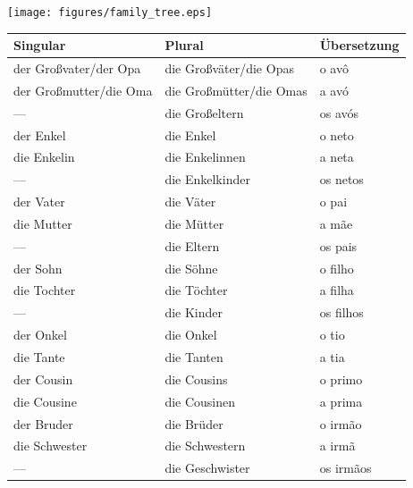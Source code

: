         \texttt{[image: figures/family\_tree.eps]}

        \renewcommand{\baselinestretch}{1}
        \renewcommand{\arraystretch}{1.5}
        \begin{longtabu}to 
            \toprule
            \textbf{Singular} & \textbf{Plural} & \textbf{Übersetzung} \\ 
            \toprule \endhead
                der Großvater/der Opa & die Großväter/die Opas & o avô\\ \hline
                der Großmutter/die Oma & die Großmütter/die Omas & a avó\\ \hline
                --- & die Großeltern & os avós\\ \hline
                der Enkel & die Enkel & o neto\\ \hline
                die Enkelin & die Enkelinnen & a neta\\ \hline
                --- & die Enkelkinder & os netos\\ \hline
                der Vater & die Väter & o pai\\ \hline
                die Mutter & die Mütter & a mãe\\ \hline
                --- & die Eltern & os pais\\ \hline
                der Sohn & die Söhne & o filho\\ \hline
                die Tochter & die Töchter & a filha\\ \hline
                --- & die Kinder & os filhos\\ \hline
                der Onkel & die Onkel & o tio\\ \hline
                die Tante & die Tanten & a tia\\ \hline
                der Cousin & die Cousins & o primo\\ \hline
                die Cousine & die Cousinen & a prima\\ \hline
                der Bruder & die Brüder & o irmão\\ \hline
                die Schwester & die Schwestern & a irmã\\ \hline
                --- & die Geschwister & os irmãos\\ \hline
            \toprule
        \end{longtabu}
        \renewcommand{\arraystretch}{1}
        \renewcommand{\baselinestretch}{1.5}

